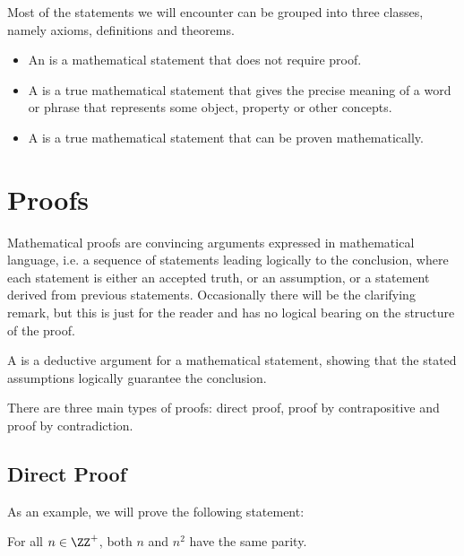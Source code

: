 Most of the statements we will encounter can be grouped into three classes, namely axioms, definitions and theorems.

\begin{definition}
    \phantom{.}
    \begin{itemize}
        \item An  is a mathematical statement that does not require proof.
        \item A  is a true mathematical statement that gives the precise meaning of a word or phrase that represents some object, property or other concepts.
        \item A  is a true mathematical statement that can be proven mathematically.
    \end{itemize}
\end{definition}

\section{Proofs}

Mathematical proofs are convincing arguments expressed in mathematical language, i.e. a sequence of statements leading logically to the conclusion, where each statement is either an accepted truth, or an assumption, or a statement derived from previous statements. Occasionally there will be the clarifying remark, but this is just for the reader and has no logical bearing on the structure of the proof.

\begin{definition}
    A  is a deductive argument for a mathematical statement, showing that the stated assumptions logically guarantee the conclusion.
\end{definition}

There are three main types of proofs: direct proof, proof by contrapositive and proof by contradiction.

\subsection{Direct Proof}

As an example, we will prove the following statement:

\begin{statement}\label{st:Proof-Eg}
    For all $n \in \ZZ^+$, both $n$ and $n^2$ have the same parity.
\end{statement}

